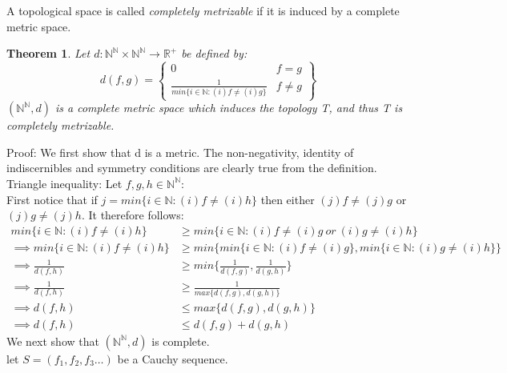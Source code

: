 \documentclass{report}
\newtheorem{theorem}{Theorem}[section]
\newenvironment{defn}[1][]{\refstepcounter{theorem}\begin{trivlist}
\item[\hskip \labelsep {\bfseries Definition  \thetheorem  \, \def\temp{#1}\ifx\temp\empty  #1\else  (#1)\fi
}]}   {\end{trivlist}}
\begin{document}
\begin{defn}
A topological space is called \textit{completely metrizable} if it is induced by a complete metric space.
\end{defn}
\begin{theorem}
Let $d:\mathbb{N}^\mathbb{N}\times\mathbb{N}^\mathbb{N}\rightarrow\mathbb{R}^+$ be defined by:
$$d(f,g)=
 \left\{
    \begin{array}{lr}
      0& f=g \\
      \frac{1}{min\{i\in\mathbb{N}:(i)f \neq (i)g\}}& f\neq g
    \end{array}
    \right\}
$$
$(\mathbb{N}^\mathbb{N}, d)$ is a complete metric space which induces the topology T, and thus T is completely metrizable.
\end{theorem}\par
Proof: We first show that d is a metric. The non-negativity, identity of indiscernibles and symmetry conditions are clearly true from the definition.\\
Triangle inequality: Let $f,g,h \in \mathbb{N}^\mathbb{N}:$\\
First notice that if $j=min\{i\in\mathbb{N}:(i)f\neq (i)h\}$ then either $(j)f\neq (j)g$ or $(j)g\neq (j)h$. It therefore follows:
\begin{align*}
min\{i\in\mathbb{N}:(i)f\neq (i)h\} &\geq min\{i\in\mathbb{N}:(i)f\neq (i)g\ or\ (i)g \neq (i)h\}\\
\implies min\{i\in\mathbb{N}:(i)f\neq (i)h\} &\geq min\{min\{i\in\mathbb{N}:(i)f\neq (i)g\},min\{i\in\mathbb{N}:(i)g\neq (i)h\}\}\\
\implies \frac{1}{d(f,h)} &\geq min\{\frac{1}{d(f,g)},\frac{1}{d(g,h)}\}\\
\implies \frac{1}{d(f,h)} &\geq \frac{1}{max\{d(f,g),d(g,h)\}}\\
\implies d(f,h) &\leq max\{d(f,g),d(g,h)\}\\
\implies d(f,h) &\leq d(f,g)+d(g,h)
\end{align*}
We next show that $(\mathbb{N}^\mathbb{N}, d)$ is complete.\\
let $S = (f_1, f_2, f_3\ldots)$ be a Cauchy sequence.\\\par
\noindent{}\\\par
\end{document}
